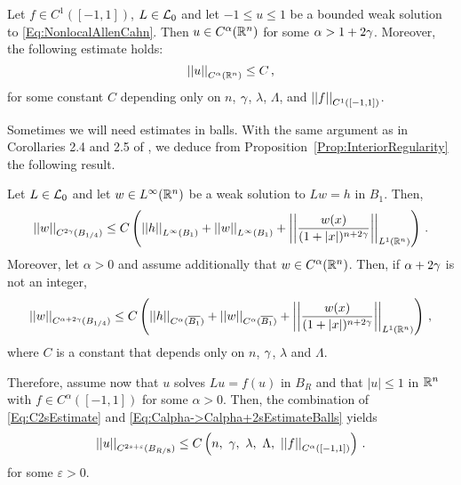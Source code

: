 \begin{corollary}
\label{Cor:C2regularity} Let $f\in C^{1}([-1,1])$, $L\in \mathcal{L}_0$ and let $-1 \leq u \leq 1$ be a
bounded weak solution to \eqref{Eq:NonlocalAllenCahn}. Then $u\in C^{\alpha}(\mathbb{R}^n)$ for some
$\alpha
> 1+ 2 \gamma$. Moreover, the following estimate holds:
\begin{equation}
\left | \left |{u} \right | \right |_{C^{\alpha}(\mathbb{R}^n)} \leq C\,,
\end{equation}
for some constant $C$ depending only on $n$, $\gamma$, $\lambda$, $\Lambda$, and $\left | \left |{f} \right | \right |_{C^1([-1,1])}$.
\end{corollary}


Sometimes we will need estimates in balls. With the same argument as in Corollaries 2.4 and 2.5 of
\cite{RosOtonSerra-Regularity}, we deduce from Proposition~\ref{Prop:InteriorRegularity} the
following result.

\begin{corollary}
\label{Cor:InteriorRegularityBalls}
Let $L\in\mathcal{L}_0$ and let $w\in L^\infty (\mathbb{R}^n)$ be a weak solution to $Lw = h$ in $B_1$. Then,
\begin{equation}
\label{Eq:C2sEstimateBalls}
\left | \left |{w} \right | \right |_{C^{2\gamma} (B_{1/4})} \leq C\left ( {\left | \left |{h} \right | \right |_{L^\infty (B_1)} + \left | \left |{w} \right | \right |_{L^\infty  (B_1)} + \left | \left |{\dfrac{w(x)}{(1+|x|)^{n+2\gamma}}} \right | \right |_{L^1(\mathbb{R}^n)} }\right )\,.
\end{equation}
Moreover, let $\alpha > 0$ and assume additionally that $w \in C^\alpha (\mathbb{R}^n)$. Then, if $\alpha +
2\gamma$ is not an integer,
\begin{equation}
\label{Eq:Calpha->Calpha+2sEstimateBalls}
\left | \left |{w} \right | \right |_{C^{\alpha + 2\gamma} (B_{1/4})} \leq C\left ( {\left | \left |{h} \right | \right |_{C^{\alpha} (\overline{B_1})} + \left | \left |{w} \right | \right |_{C^\alpha (\overline{B_1})} + \left | \left |{\dfrac{w(x)}{(1+|x|)^{n+2\gamma}}} \right | \right |_{L^1(\mathbb{R}^n)} }\right )\,,
\end{equation}
where $C$ is a constant that depends only on $n$, $\gamma$, $\lambda$ and $\Lambda$.
\end{corollary}

Therefore, assume now that $u$ solves $Lu = f(u)$ in $B_R$ and that $|u|\leq 1$ in $\mathbb{R}^n$ with
$f\in C^{\alpha}([-1,1])$ for some $\alpha > 0$. Then, the combination of \eqref{Eq:C2sEstimate}
and \eqref{Eq:Calpha->Calpha+2sEstimateBalls} yields
\begin{equation}
\label{Eq:UniformC2alphaEstimateBalls}
\norm{u}_{C^{2s + \varepsilon}(B_{R/8})} \leq C \bpar{n,\ \s ,\ \lambda,\ \Lambda ,\ \norm{f}_{C^{\alpha}([-1,1])} }\,.
\end{equation}
for some $\varepsilon > 0$.

